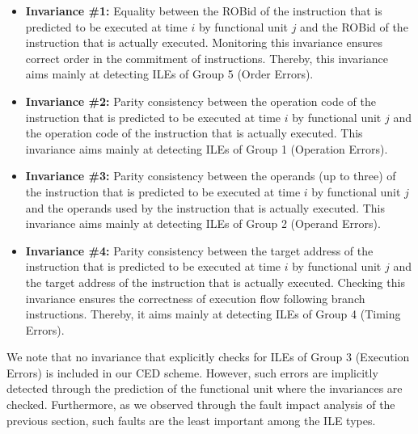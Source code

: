\documentclass[12pt]{yalephd}
\begin{document}
\begin{itemize}
\item {\bf Invariance \#1:} Equality between the ROBid of the instruction that is predicted to be executed at time $i$ by functional unit $j$ and the ROBid of the instruction that is actually executed. Monitoring this invariance ensures correct order in the commitment of instructions. Thereby, this invariance aims mainly at detecting ILEs of Group 5 (Order Errors).

\item {\bf Invariance \#2:} Parity consistency between the operation code of the instruction that is predicted to be executed at time $i$ by functional unit $j$ and the operation code of the instruction that is actually executed. This invariance aims mainly at detecting ILEs of Group 1 (Operation Errors).

\item {\bf Invariance \#3:} Parity consistency between the operands (up to three) of the instruction that is predicted to be executed at time $i$ by functional unit $j$ and the operands used by the instruction that is actually executed. This invariance aims mainly at detecting ILEs of Group 2 (Operand Errors).

\item {\bf Invariance \#4:} Parity consistency between the target address of the instruction that is predicted to be executed at time $i$ by functional unit $j$ and the target address of the instruction that is actually executed. Checking this invariance ensures the correctness of execution flow following branch instructions. Thereby, it aims mainly at detecting ILEs of Group 4 (Timing Errors).
\end{itemize}


\noindent We note that no invariance that explicitly checks for ILEs of Group 3 (Execution Errors) is included in our CED scheme. However, such errors are implicitly detected through the prediction of the functional unit where the invariances are checked. Furthermore, as we observed through the fault impact analysis of the previous section, such faults are the least important among the ILE types.
\end{document}
